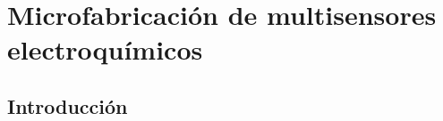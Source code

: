  \newcommand{\NoBiblioMicro}[1]{
 \ifthenelse{\equal{#1}{verdadero}}{}{}
 \NoBiblioMicro{verdadero}}

 
 \FormatoCapituloDosLineas
 
 \chapter{Microfabricación de multisensores electroquímicos}\label{chap:Microfabricacion}

 \thispagestyle{empty}
	
 
 
 \vfill
 \minitoc
 \newpage

\section{Introducción}
	
